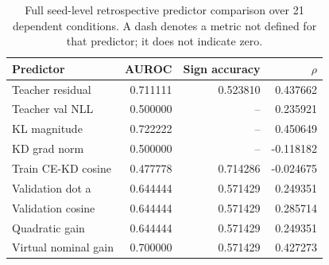 \begingroup\small
\setlength{\tabcolsep}{5pt}
\begin{table}[htbp]\centering
\begin{tabular}{lrrr}
\toprule
Predictor & AUROC & Sign accuracy & $\rho$ \\
\midrule
Teacher residual & 0.711111 & 0.523810 & 0.437662 \\
Teacher val NLL & 0.500000 & -- & 0.235921 \\
KL magnitude & 0.722222 & -- & 0.450649 \\
KD grad norm & 0.500000 & -- & -0.118182 \\
Train CE-KD cosine & 0.477778 & 0.714286 & -0.024675 \\
Validation dot a & 0.644444 & 0.571429 & 0.249351 \\
Validation cosine & 0.644444 & 0.571429 & 0.285714 \\
Quadratic gain & 0.644444 & 0.571429 & 0.249351 \\
Virtual nominal gain & 0.700000 & 0.571429 & 0.427273 \\
\bottomrule
\end{tabular}
\caption{Full seed-level retrospective predictor comparison over 21 dependent conditions. A dash denotes a metric not defined for that predictor; it does not indicate zero.}\label{tab:full_predictors}
\end{table}
\endgroup
